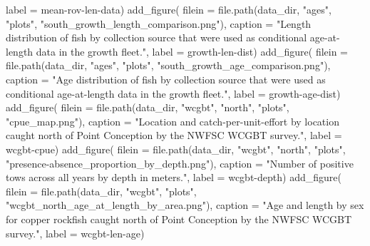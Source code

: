 \documentclass[
  letterpaper,
]{article}
\newenvironment{Shaded}{\begin{snugshade}}{\end{snugshade}}
\newcommand{\AttributeTok}[1]{\textcolor[rgb]{0.77,0.63,0.00}{#1}}
\newcommand{\FunctionTok}[1]{\textcolor[rgb]{0.00,0.00,0.00}{#1}}
\newcommand{\NormalTok}[1]{#1}
\newcommand{\StringTok}[1]{\textcolor[rgb]{0.31,0.60,0.02}{#1}}
\begin{document}
\begin{Shaded}
\begin{Highlighting}[]
\AttributeTok{label =} \StringTok{\textquotesingle{}mean{-}rov{-}len{-}data\textquotesingle{}}\NormalTok{)}
\FunctionTok{add\_figure}\NormalTok{(}
\AttributeTok{filein =} \FunctionTok{file.path}\NormalTok{(data\_dir, }\StringTok{"ages"}\NormalTok{,  }\StringTok{"plots"}\NormalTok{, }\StringTok{"south\_growth\_length\_comparison.png"}\NormalTok{), }
\AttributeTok{caption =} \StringTok{"Length distribution of fish by collection source that were used as conditional age{-}at{-}length data in the growth fleet."}\NormalTok{,}
\AttributeTok{label =} \StringTok{\textquotesingle{}growth{-}len{-}dist\textquotesingle{}}\NormalTok{)}
\FunctionTok{add\_figure}\NormalTok{(}
\AttributeTok{filein =} \FunctionTok{file.path}\NormalTok{(data\_dir, }\StringTok{"ages"}\NormalTok{,  }\StringTok{"plots"}\NormalTok{, }\StringTok{"south\_growth\_age\_comparison.png"}\NormalTok{), }
\AttributeTok{caption =} \StringTok{"Age distribution of fish by collection source that were used as conditional age{-}at{-}length data in the growth fleet."}\NormalTok{,}
\AttributeTok{label =} \StringTok{\textquotesingle{}growth{-}age{-}dist\textquotesingle{}}\NormalTok{)}
\FunctionTok{add\_figure}\NormalTok{(}
\AttributeTok{filein =} \FunctionTok{file.path}\NormalTok{(data\_dir, }\StringTok{"wcgbt"}\NormalTok{, }\StringTok{"north"}\NormalTok{, }\StringTok{"plots"}\NormalTok{, }\StringTok{"cpue\_map.png"}\NormalTok{), }
\AttributeTok{caption =} \StringTok{"Location and catch{-}per{-}unit{-}effort by location caught north of Point Conception by the NWFSC WCGBT survey."}\NormalTok{,}
\AttributeTok{label =} \StringTok{\textquotesingle{}wcgbt{-}cpue\textquotesingle{}}\NormalTok{)}
\FunctionTok{add\_figure}\NormalTok{(}
\AttributeTok{filein =} \FunctionTok{file.path}\NormalTok{(data\_dir, }\StringTok{"wcgbt"}\NormalTok{, }\StringTok{"north"}\NormalTok{, }\StringTok{"plots"}\NormalTok{, }\StringTok{"presence{-}absence\_proportion\_by\_depth.png"}\NormalTok{), }
\AttributeTok{caption =} \StringTok{"Number of positive tows across all years by depth in meters."}\NormalTok{,}
\AttributeTok{label =} \StringTok{\textquotesingle{}wcgbt{-}depth\textquotesingle{}}\NormalTok{)}
\FunctionTok{add\_figure}\NormalTok{(}
\AttributeTok{filein =} \FunctionTok{file.path}\NormalTok{(data\_dir, }\StringTok{"wcgbt"}\NormalTok{, }\StringTok{"plots"}\NormalTok{, }\StringTok{"wcgbt\_north\_age\_at\_length\_by\_area.png"}\NormalTok{), }
\AttributeTok{caption =} \StringTok{"Age and length by sex for copper rockfish caught north of Point Conception by the NWFSC WCGBT survey."}\NormalTok{,}
\AttributeTok{label =} \StringTok{\textquotesingle{}wcgbt{-}len{-}age\textquotesingle{}}\NormalTok{)}

\end{Highlighting}
\end{Shaded}
\end{document}
